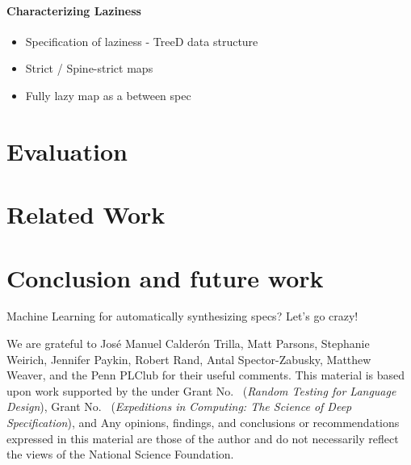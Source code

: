 \documentclass[acmsmall,review]{acmart}\settopmatter{}
\begin{document}

\paragraph*{Characterizing Laziness}

\begin{itemize}
\item Specification of laziness - TreeD data structure 
\item Strict / Spine-strict maps
\item Fully lazy map as a between spec
\end{itemize}

\section{Evaluation}
\label{sec:eval}

\section{Related Work}
\label{sec:related}


\section{Conclusion and future work}
\label{sec:concl}

Machine Learning for automatically synthesizing specs? Let's go crazy!

\begin{acks}                            %
We are grateful to
%
Jos\'e Manuel Calder\'on Trilla,
Matt Parsons,
Stephanie Weirich,
Jennifer Paykin,
Robert Rand,
Antal Spector-Zabusky,
Matthew Weaver,
and the Penn PLClub
for their useful comments.
This material is based upon work supported by the
 under Grant
No.~ ({\em Random Testing for Language
Design}), Grant No.~ ({\em Expeditions
in Computing: The Science of Deep Specification}), and  Any opinions, findings, and
conclusions or recommendations expressed in this material are those of
the author and do not necessarily reflect the views of the National
Science Foundation.

\end{acks}

%



%
\end{document}

